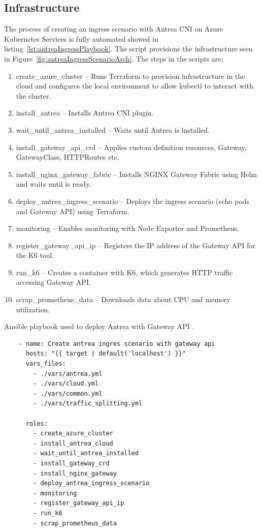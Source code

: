 \subsection{Infrastructure}
\label{sec:infra}

The process of creating an ingress scenario with Antrea CNI on Azure Kubernetes Services is fully automated showed in listing~\ref{lst:antreaIngressPlaybook}. The script provisions the infrastructure seen in Figure~\ref{fig:antreaIngressScenarioArch}. The steps in the scripts are: 


\begin{enumerate}
  \item create\_azure\_cluster -- Runs Terraform to provision infrastructure in the cloud and configures the local environment to allow kubectl to interact with the cluster.
  \item install\_antrea -- Installs Antrea CNI plugin.
  \item wait\_until\_antrea\_installed -- Waits until Antrea is installed.
  \item install\_gateway\_api\_crd -- Applies custom definition resources, Gateway, GatewayClass, HTTPRoutes etc.
  \item install\_nginx\_gateway\_fabric -- Installs NGINX Gateway Fabric using Helm and waits until is ready.
  \item deploy\_antrea\_ingress\_scenario -- Deploys the ingress scenario (echo pods and Gateway API) using Terraform.
  \item monitoring -- Enables monitoring with Node Exporter and Prometheus.
  \item register\_gateway\_api\_ip -- Registers the IP address of the Gateway API for the K6 tool.
  \item run\_k6 -- Creates a container with K6, which generates HTTP traffic accessing Gateway API.
  \item scrap\_prometheus\_data -- Downloads data about CPU and memory utilization.
\end{enumerate}

\begin{listing}[H]
  \centering
  \caption{Ansible playbook used to deploy Antrea with Gateway API \cite{AnsiblePlaybook}.}
  \begin{verbatim}
    - name: Create antrea ingres scenario with gateway api
      hosts: "{{ target | default('localhost') }}"
      vars_files:
        - ./vars/antrea.yml
        - ./vars/cloud.yml
        - ./vars/common.yml
        - ./vars/traffic_splitting.yml

      roles:
        - create_azure_cluster
        - install_antrea_cloud
        - wait_until_antrea_installed
        - install_gateway_crd
        - install_nginx_gateway
        - deploy_antrea_ingress_scenario
        - monitoring
        - register_gateway_api_ip
        - run_k6
        - scrap_prometheus_data
  \end{verbatim}
  \label{lst:antreaIngressPlaybook}
\end{listing}


